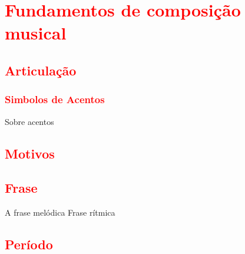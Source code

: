 
\chapter{\textcolor{red}{Fundamentos de composição musical}}

\section{\textcolor{red}{Articulação}}


\subsection{\textcolor{red}{Simbolos de Acentos}}

Sobre acentos  \cite[pp. 9]{phillips2002sight}

\section{\textcolor{red}{Motivos}}

\section{\textcolor{red}{Frase}}
\cite[pp. 150]{medteoria}


A frase melódica
Frase rítmica
\section{\textcolor{red}{Período}}
